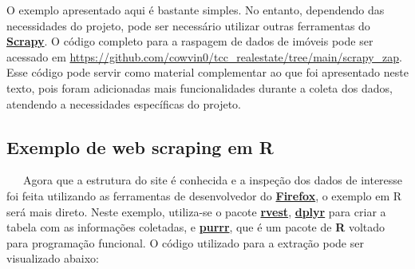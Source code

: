 \documentclass[
  12pt,
  a4paper,
]{scrreprt}
\begin{document}
\vspace{12pt}

O exemplo apresentado aqui é bastante simples. No entanto, dependendo
das necessidades do projeto, pode ser necessário utilizar outras
ferramentas do
\href{https://docs.scrapy.org/en/latest}{\textbf{Scrapy}}. O código
completo para a raspagem de dados de imóveis pode ser acessado em
\url{https://github.com/cowvin0/tcc_realestate/tree/main/scrapy_zap}.
Esse código pode servir como material complementar ao que foi
apresentado neste texto, pois foram adicionadas mais funcionalidades
durante a coleta dos dados, atendendo a necessidades específicas do
projeto.

\subsection{Exemplo de web scraping em
R}\label{exemplo-de-web-scraping-em-r}

~~~Agora que a estrutura do site é conhecida e a inspeção dos dados de
interesse foi feita utilizando as ferramentas de desenvolvedor do
\href{https://www.mozilla.org/pt-BR/firefox/}{\textbf{Firefox}}, o
exemplo em R será mais direto. Neste exemplo, utiliza-se o pacote
\href{https://rvest.tidyverse.org/}{\textbf{rvest}},
\href{https://dplyr.tidyverse.org/}{\textbf{dplyr}} para criar a tabela
com as informações coletadas, e
\href{https://purrr.tidyverse.org/}{\textbf{purrr}}, que é um pacote de
\textbf{R} voltado para programação funcional. O código utilizado para a
extração pode ser visualizado abaixo:
\end{document}

